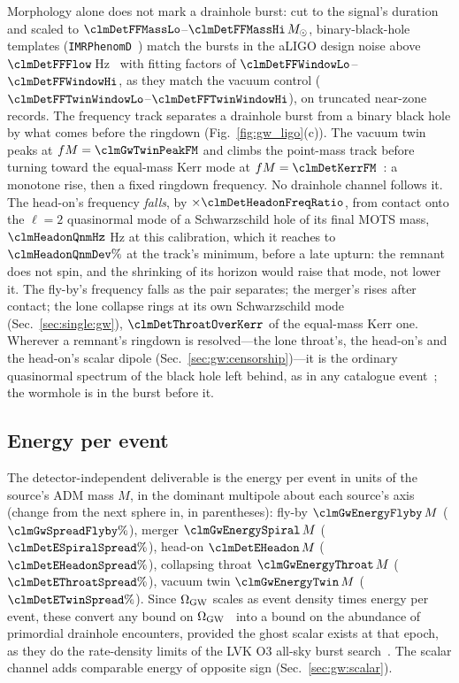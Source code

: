 \documentclass[twocolumn,floatfix,aps,prd,superscriptaddress,nofootinbib]{revtex4-2}
\begin{document}
Morphology alone does not mark a drainhole burst: cut to the signal's duration and scaled to $\clmDetFFMassLo$--$\clmDetFFMassHi\,M_\odot$, binary-black-hole templates (\texttt{IMRPhenomD}~\cite{husa2016,khan2016}) match the bursts in the aLIGO design noise above $\clmDetFFFlow$\,Hz~\cite{aligo2010} with fitting factors of $\clmDetFFWindowLo$--$\clmDetFFWindowHi$, as they match the vacuum control ($\clmDetFFTwinWindowLo$--$\clmDetFFTwinWindowHi$), on truncated near-zone records. The frequency track separates a drainhole burst from a binary black hole by what comes before the ringdown (Fig.~\ref{fig:gw_ligo}(c)). The vacuum twin peaks at $fM=\clmGwTwinPeakFM$ and climbs the point-mass track before turning toward the equal-mass Kerr mode at $fM=\clmDetKerrFM$~\cite{berti2006,berti2009}: a monotone rise, then a fixed ringdown frequency. No drainhole channel follows it. The head-on's frequency \emph{falls}, by $\times\clmDetHeadonFreqRatio$, from contact onto the $\ell=2$ quasinormal mode of a Schwarzschild hole of its final MOTS mass, $\clmHeadonQnmHz$ Hz at this calibration, which it reaches to $\clmHeadonQnmDev\%$ at the track's minimum, before a late upturn: the remnant does not spin, and the shrinking of its horizon would raise that mode, not lower it. The fly-by's frequency falls as the pair separates; the merger's rises after contact; the lone collapse rings at its own Schwarzschild mode (Sec.~\ref{sec:single:gw}), $\clmDetThroatOverKerr$ of the equal-mass Kerr one. Wherever a remnant's ringdown is resolved---the lone throat's, the head-on's and the head-on's scalar dipole (Sec.~\ref{sec:gw:censorship})---it is the ordinary quasinormal spectrum of the black hole left behind, as in any catalogue event~\cite{gwtc3}; the wormhole is in the burst before it.

\subsection{Energy per event}
\label{sec:ligo:burst}

The detector-independent deliverable is the energy per event in units of the source's ADM mass $M$, in the dominant multipole about each source's axis (change from the next sphere in, in parentheses): fly-by $\clmGwEnergyFlyby\,M$ ($\clmGwSpreadFlyby\%$), merger $\clmGwEnergySpiral\,M$ ($\clmDetESpiralSpread\%$), head-on $\clmDetEHeadon\,M$ ($\clmDetEHeadonSpread\%$), collapsing throat $\clmGwEnergyThroat\,M$ ($\clmDetEThroatSpread\%$), vacuum twin $\clmGwEnergyTwin\,M$ ($\clmDetETwinSpread\%$). Since $\Omega_{\rm GW}$ scales as event density times energy per event, these convert any bound on $\Omega_{\rm GW}$~\cite{lvk2021,pagano2016} into a bound on the abundance of primordial drainhole encounters, provided the ghost scalar exists at that epoch, as they do the rate-density limits of the LVK O3 all-sky burst search~\cite{lvk2021burst}. The scalar channel adds comparable energy of opposite sign (Sec.~\ref{sec:gw:scalar}).
\end{document}
